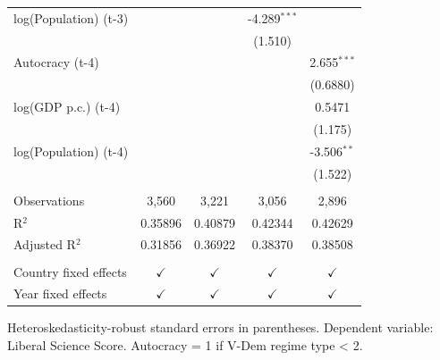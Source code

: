 \begin{table}[htbp]
\begin{tabular}{lcccc}
      log(Population) (t-3) &                &                & -4.289$^{***}$ &   \\   
                            &                &                & (1.510)        &   \\   
      Autocracy (t-4)       &                &                &                & 2.655$^{***}$\\   
                            &                &                &                & (0.6880)\\   
      log(GDP p.c.) (t-4)   &                &                &                & 0.5471\\   
                            &                &                &                & (1.175)\\   
      log(Population) (t-4) &                &                &                & -3.506$^{**}$\\   
                            &                &                &                & (1.522)\\   
       \\
      Observations          & 3,560          & 3,221          & 3,056          & 2,896\\  
      R$^2$                 & 0.35896        & 0.40879        & 0.42344        & 0.42629\\  
      Adjusted R$^2$        & 0.31856        & 0.36922        & 0.38370        & 0.38508\\  
       \\
      Country fixed effects & $\checkmark$   & $\checkmark$   & $\checkmark$   & $\checkmark$\\   
      Year fixed effects    & $\checkmark$   & $\checkmark$   & $\checkmark$   & $\checkmark$\\   
      \bottomrule
   \end{tabular}
   
   \par \raggedright 
   Heteroskedasticity-robust standard errors in parentheses. Dependent variable: Liberal Science Score. Autocracy = 1 if V-Dem regime type < 2.
\end{table}


